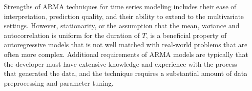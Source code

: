 Strengths of ARMA techniques for time series modeling includes their ease of interpretation, prediction quality, and their ability to extend to the multivariate settings.  However, stationarity, or the assumption that the mean, variance and autocorrelation is uniform for the duration of $T$, is a beneficial property of autoregressive models that is not well matched with real-world problems that are often more complex.  Additional requirements of ARMA models are typically that the developer must have extensive knowledge and experience with the process that generated the data, and the technique requires a substantial amount of data preprocessing and parameter tuning.







